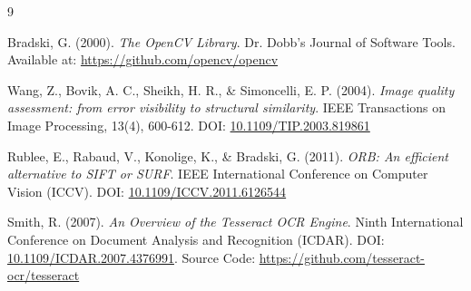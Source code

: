\documentclass[12pt,a4paper]{article}
\begin{document}
\begin{thebibliography}{9}

Bradski, G. (2000).
\textit{The OpenCV Library}. Dr. Dobb's Journal of Software Tools. 
Available at: \url{https://github.com/opencv/opencv}

Wang, Z., Bovik, A. C., Sheikh, H. R., \& Simoncelli, E. P. (2004).
\textit{Image quality assessment: from error visibility to structural similarity}. IEEE Transactions on Image Processing, 13(4), 600-612. 
DOI: \href{https://doi.org/10.1109/TIP.2003.819861}{10.1109/TIP.2003.819861}

Rublee, E., Rabaud, V., Konolige, K., \& Bradski, G. (2011).
\textit{ORB: An efficient alternative to SIFT or SURF}. IEEE International Conference on Computer Vision (ICCV). 
DOI: \href{https://doi.org/10.1109/ICCV.2011.6126544}{10.1109/ICCV.2011.6126544}

Smith, R. (2007).
\textit{An Overview of the Tesseract OCR Engine}. Ninth International Conference on Document Analysis and Recognition (ICDAR). 
DOI: \href{https://doi.org/10.1109/ICDAR.2007.4376991}{10.1109/ICDAR.2007.4376991}. 
Source Code: \url{https://github.com/tesseract-ocr/tesseract}

\end{thebibliography}
\end{document}
